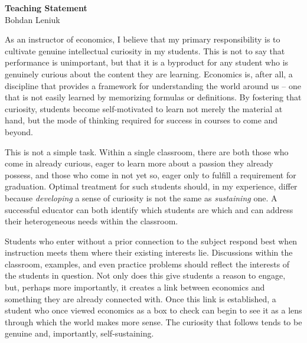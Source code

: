 \documentclass[12pt]{article}
\begin{document}
\thispagestyle{firstpage}

\begin{center}
    {\large \textbf{Teaching Statement}} \\[0.5em]
    Bohdan Leniuk
\end{center}

\vspace{0.5em}

As an instructor of economics, I believe that my primary responsibility is to cultivate genuine intellectual curiosity in my students. This is not to say that performance is unimportant, but that it is a byproduct for any student who is genuinely curious about the content they are learning. Economics is, after all, a discipline that provides a framework for understanding the world around us -- one that is not easily learned by memorizing formulas or definitions. By fostering that curiosity, students become self-motivated to learn not merely the material at hand, but the mode of thinking required for success in courses to come and beyond.  

This is not a simple task. Within a single classroom, there are both those who come in already curious, eager to learn more about a passion they already possess, and those who come in not yet so, eager only to fulfill a requirement for graduation. Optimal treatment for such students should, in my experience, differ because \textit{developing} a sense of curiosity is not the same as \textit{sustaining} one. A successful educator can both identify which students are which and can address their heterogeneous needs within the classroom. 

Students who enter without a prior connection to the subject respond best when instruction meets them where their existing interests lie. Discussions within the classroom, examples, and even practice problems should reflect the interests of the students in question. Not only does this give students a reason to engage, but, perhaps more importantly, it creates a link between economics and something they are already connected with. Once this link is established, a student who once viewed economics as a box to check can begin to see it as a lens through which the world makes more sense. The curiosity that follows tends to be genuine and, importantly, self-sustaining. 
\end{document}
